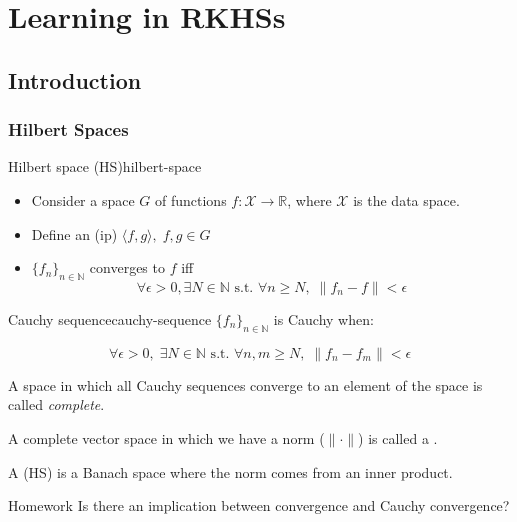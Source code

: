 \chapter[RKHSs]{Learning in RKHSs}

\section{Introduction}

\subsection{Hilbert Spaces}

\begin{definition}[parbox=false]{Hilbert space (HS)}{hilbert-space}
	\begin{itemize}
		\item Consider a space $G$ of functions $f: \mathcal{X} \to \mathbb{R}$,
		      where $\mathcal{X}$ is the data space.

		\item Define an  (ip) $\langle f, g \rangle, \; f, g \in G$ %
		\item $\{f_n\}_{n \in \mathds{N}}$ converges to $f$ iff
		      $$\forall \epsilon > 0, \exists N \in \mathds{N} \text{ s.t. } \forall n \geq N, \; \lVert f_n - f \rVert < \epsilon$$
	\end{itemize}
	\begin{definition}{Cauchy sequence}{cauchy-sequence}
		$\{f_n\}_{n \in \mathds{N}}$ is Cauchy when:

		$$\forall \epsilon > 0, \; \exists N \in \mathds{N} \text{ s.t. } \forall n, m \geq N, \; \lVert f_n - f_m \rVert < \epsilon$$
	\end{definition}

	A space in which all Cauchy sequences converge to an element of the space is
	called \emph{complete}.

	A complete vector space in which we have
	a norm ($\lVert \cdot \rVert$) is called a .

	\begin{marker}
		A  (HS) is a Banach space where the norm
		comes from an inner product.
	\end{marker}

\end{definition}

\begin{question}{Homework}{}
	Is there an implication between convergence and Cauchy convergence?
\end{question}

